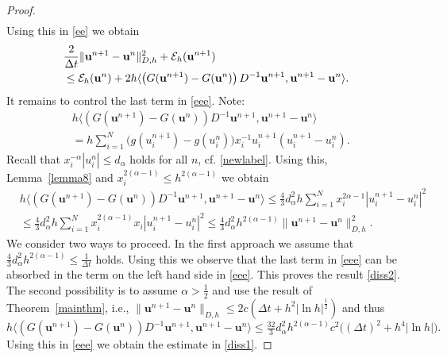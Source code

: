 \documentclass{siamltex}
\newcommand{\bu}{\mathbf u}
\newcommand{\cE}{\mathcal E}
\begin{document}
{\begin{proof}
\begin{align*}
	\end{align*}
	Using this in \eqref{ee} we obtain
	\begin{align} 
	& \frac{2}{\Delta t} \|\bu^{n+1}-\bu^n\|_{D,h}^2+ \cE_h(\bu^{n+1}) \notag \\ 
		  & \leq \cE_h(\bu^{n}) +
		2 h\langle \left( G(\bu^{n+1})-G(\bu^{n})\right) D^{-1}\bu^{n+1},\bu^{n+1}-\bu^{n} \rangle. 
		 \label{eee} \end{align}
	It remains to control the last term in \eqref{eee}. Note:
	\begin{align*} &  h\langle \left( G(\bu^{n+1})-G(\bu^{n})\right) D^{-1}\bu^{n+1},\bu^{n+1}-\bu^{n} \rangle \\ & = h \sum_{i=1}^N \big(g(u_i^{n+1})-g(u_i^{n})\big) x_i^{-1} u_i^{n+1} (u_i^{n+1}-u_i^n).
	\end{align*}
	Recall that $x_i^{-\alpha} |u_i^n| \leq d_\alpha$ holds for all $n$, cf. \eqref{newlabel}.  Using this, Lemma~\ref{lemma8} and $x_i^{2(\alpha-1)} \leq h^{2(\alpha-1)}$ we obtain
	\begin{align*}   
	  & h\langle \left( G(\bu^{n+1})-G(\bu^{n})\right) D^{-1}\bu^{n+1},\bu^{n+1}-\bu^{n} \rangle \leq \tfrac43 d_\alpha^2h \sum_{i=1}^N x_i^{2\alpha -1} |u_i^{n+1}-u_i^n|^2 \\
	& \leq  \tfrac43 d_\alpha^2h \sum_{i=1}^N x_i^{2(\alpha -1)} x_i |u_i^{n+1}-u_i^n|^2 \leq \tfrac43 d_\alpha^2 h^{2(\alpha-1)} \|\bu^{n+1} - \bu^n\|_{D,h}^2.
\end{align*}
We consider two ways to proceed. In the first approach we   assume that $\frac43 d_\alpha^2 h^{2(\alpha-1)} \leq \frac{1}{\Delta t}$ holds. Using this we observe that the last term in  \eqref{eee}  can be absorbed in the term on the left hand side in \eqref{eee}.  This proves the result \eqref{diss2}. The second possibility is to assume $\alpha > \frac12$ and use the result of Theorem~\ref{mainthm}, i.e., $\|\bu^{n+1} - \bu^n\|_{D,h} \leq 2 c(\Delta t +h^2 |\ln h|^\frac12)$ and thus
\[
  h\langle \left( G(\bu^{n+1})-G(\bu^{n})\right) D^{-1}\bu^{n+1},\bu^{n+1}-\bu^{n} \rangle  \leq
  \tfrac{32}{3} d_\alpha^2 h^{2(\alpha-1)} c^2\big((\Delta t)^2 + h^4 |\ln h|\big).
\]
Using this in \eqref{eee} we obtain the estimate in \eqref{diss1}.
\end{proof}

}
\end{document}
